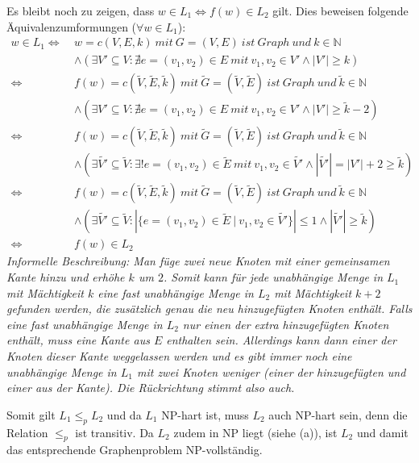 	Es bleibt noch zu zeigen, dass $w \in L_1 \Leftrightarrow f(w) \in L_2$ gilt. Dies beweisen folgende Äquivalenzumformungen ($\forall w \in L_1$):
	\begin{align*}
		w \in L_1 \Leftrightarrow\ & w=c(V,E,k)\ mit\ G=(V,E)\ ist\ Graph\ und\ k \in \mathbb{N}\\
		& \wedge (\exists V'\subseteq V:\nexists e=(v_1,v_2)\in E\ mit\ v_1,v_2 \in V' \wedge |V'|\geq k)\\
		\Leftrightarrow\ &f(w)=c(\tilde{V},\tilde{E},\tilde{k})\ mit\ \tilde{G}=(\tilde{V},\tilde{E})\ ist\ Graph\ und\ \tilde{k} \in \mathbb{N}\\
		& \wedge (\exists V'\subseteq V:\nexists e=(v_1,v_2)\in E\ mit\ v_1,v_2 \in V' \wedge |V'|\geq \tilde{k}-2)\\
		\Leftrightarrow\ &f(w)=c(\tilde{V},\tilde{E},\tilde{k})\ mit\ \tilde{G}=(\tilde{V},\tilde{E})\ ist\ Graph\ und\ \tilde{k} \in \mathbb{N}\\
		& \wedge (\exists \tilde{V'}\subseteq \tilde{V}:\exists! e=(v_1,v_2)\in \tilde{E}\ mit\ v_1,v_2 \in \tilde{V'} \wedge |\tilde{V'}|=|V'|+2\geq \tilde{k})\\
		\Leftrightarrow\ &f(w)=c(\tilde{V},\tilde{E},\tilde{k})\ mit\ \tilde{G}=(\tilde{V},\tilde{E})\ ist\ Graph\ und\ \tilde{k} \in \mathbb{N}\\
		& \wedge (\exists \tilde{V'}\subseteq \tilde{V}: |\{e=(v_1,v_2)\in \tilde{E}\ \vert\ v_1,v_2 \in \tilde{V'}\}|\leq 1 \wedge |\tilde{V'}|\geq \tilde{k})\\
		\Leftrightarrow\ &f(w) \in L_2
	\end{align*}
	\textit{Informelle Beschreibung: Man füge zwei neue Knoten mit einer gemeinsamen Kante hinzu und erhöhe $k$ um $2$. Somit kann für jede unabhängige Menge in $L_1$ mit Mächtigkeit $k$ eine fast unabhängige Menge in $L_2$ mit Mächtigkeit $k+2$ gefunden werden, die zusätzlich genau die neu hinzugefügten Knoten enthält. Falls eine fast unabhängige Menge in $L_2$ nur einen der extra hinzugefügten Knoten enthält, muss eine Kante aus $E$ enthalten sein. Allerdings kann dann einer der Knoten dieser Kante weggelassen werden und es gibt immer noch eine unabhängige Menge in $L_1$ mit zwei Knoten weniger (einer der hinzugefügten und einer aus der Kante). Die Rückrichtung stimmt also auch.}

	Somit gilt $L_1 \leq_p L_2$ und da $L_1$ NP-hart ist, muss $L_2$ auch NP-hart sein, denn die Relation $\leq_p$ ist transitiv. Da $L_2$ zudem in NP liegt (siehe (a)), ist $L_2$ und damit das entsprechende Graphenproblem NP-vollständig.
	


\newpage
